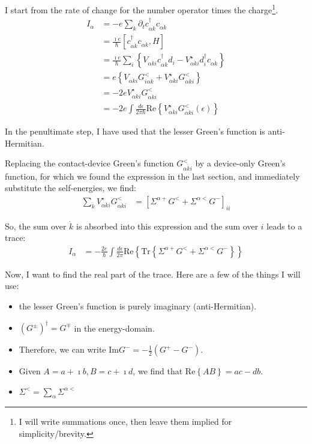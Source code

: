 I start from the rate of change for the number operator times the charge\footnote{I will write summations once, then leave them implied for simplicity/brevity.}.  
\begin{align*}
I_\alpha &= - e \sum_{\dot{k}} \partial_t c^\dagger_{\alpha\dot{k}} c_{\alpha\dot{k}} \\
&= \frac{\imath e}{\hbar} \left[ c^\dagger_{\alpha\dot{k}} c_{\alpha\dot{k}}, H\right] \\
&= \frac{\imath e}{\hbar}\sum_i \left\{ V_{\alpha\dot{k}i} c^\dagger_{\alpha\dot{k}} d_i - V^\star_{\alpha\dot{k}i} d_i^\dagger c_{\alpha\dot{k}}\right\} \\
&= e \left\{ V_{\alpha\dot{k}i} G^<_{i\alpha\dot{k}} + V_{\alpha\dot{k}i}^\star G^<_{\alpha\dot{k}i}\right\}\\
&= -2e V^\star_{\alpha\dot{k}i}G^<_{\alpha\dot{k}i} \\
&= -2e \int \frac{d\epsilon}{2\pi\hbar} \text{Re}\left\{ V^\star_{\alpha\dot{k}i} G^<_{\alpha\dot{k}i} (\epsilon) \right\}
\end{align*}

In the penultimate step, I have used that the lesser Green's function is anti-Hermitian. 

Replacing the contact-device Green's function $G^<_{\alpha\dot{k}i}$ by a device-only Green's function, for which we found the expression in the last section, and immediately substitute the self-energies, we find:
\begin{align*}
\sum_{\dot{k}} V^\star_{\alpha\dot{k}i} G^<_{\alpha\dot{k}i} &= \left[\Sigma^{\alpha+} G^< + \Sigma^{\alpha <} G^-\right]_{ii}
\end{align*}

So, the sum over $\dot{k}$ is absorbed into this expression and the sum over $i$ leads to a trace:
\begin{align*}
I_\alpha &= -\frac{2e}{\hbar} \int \frac{d\epsilon}{2\pi} \text{Re} \left\{ \text{Tr} \left \{ \Sigma^{\alpha+} G^< + \Sigma^{\alpha <} G^-\right\}\right\}
\end{align*}

Now, I want to find the real part of the trace. Here are a few of the things I will use:
\begin{itemize}
\item the lesser Green's function is purely imaginary (anti-Hermitian). 
\item $(G^\pm)^\dagger = G^\mp$ in the energy-domain.
\item Therefore, we can write $\text{Im} G^- = - \frac{1}{2} \left( G^+ - G^- \right)$.
\item Given $A=a+\imath b, B = c + \imath d$, we find that $\text{Re}\left\{ AB \right\} = ac - db$.
\item $\Sigma^< = \sum_\alpha \Sigma^{\alpha<}$
\end{itemize}

